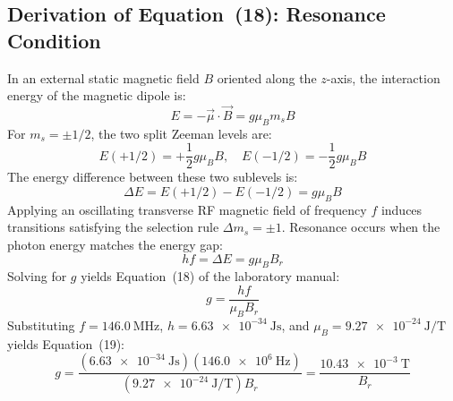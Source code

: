 \documentclass[journal]{IEEEtran}
\begin{document}
\subsection{Derivation of Equation~(18): Resonance Condition}
In an external static magnetic field $B$ oriented along the $z$-axis, the interaction energy of the magnetic dipole is:
\begin{equation}
    E = -\vec{\mu} \cdot \vec{B} = g \mu_B m_s B
    \label{eq:zeeman_levels}
\end{equation}
For $m_s = \pm 1/2$, the two split Zeeman levels are:
\begin{equation}
    E(+1/2) = +\frac{1}{2} g \mu_B B, \quad E(-1/2) = -\frac{1}{2} g \mu_B B
\end{equation}
The energy difference between these two sublevels is:
\begin{equation}
    \Delta E = E(+1/2) - E(-1/2) = g \mu_B B
    \label{eq:zeeman_split}
\end{equation}
Applying an oscillating transverse RF magnetic field of frequency $f$ induces transitions satisfying the selection rule $\Delta m_s = \pm 1$. Resonance occurs when the photon energy matches the energy gap:
\begin{equation}
    h f = \Delta E = g \mu_B B_r
    \label{eq:resonance_condition}
\end{equation}
Solving for $g$ yields Equation~(18) of the laboratory manual:
\begin{equation}
    g = \frac{h f}{\mu_B B_r}
    \label{eq:g_from_Br}
\end{equation}
Substituting $f = \SI{146.0}{\mega\hertz}$, $h = \SI{6.63e-34}{\joule\second}$, and $\mu_B = \SI{9.27e-24}{\joule\per\tesla}$ yields Equation~(19):
\begin{equation}
    g = \frac{(\SI{6.63e-34}{\joule\second}) (\SI{146.0e6}{\hertz})}{(\SI{9.27e-24}{\joule\per\tesla}) B_r} = \frac{\SI{10.43e-3}{\tesla}}{B_r}
    \label{eq:g_numerical_constant}
\end{equation}
\end{document}
